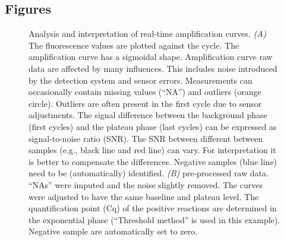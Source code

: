 \documentclass[twocolumn]{bmcart}%
\begin{document}
\begin{backmatter}




\section*{Figures}
  \begin{figure}[h]
  \caption{\label{figure:problems}
Analysis and interpretation of real-time amplification curves. \emph{(A)} The 
fluorescence values are plotted against the cycle. The amplification curve has a 
sigmoidal shape. Amplification curve raw data are affected by many influences. 
This includes noise introduced by the detection system and sensor errors. 
Measurements can occasionally contain missing values (``NA'') and outliers 
(orange circle). Outliers are often present in the first cycle due to sensor 
adjustments. The signal difference between the background phase (first cycles) 
and the plateau phase (last cycles) can be expressed as signal-to-noise ratio 
(SNR). The SNR between different between samples (e.g., black line and red line) 
can vary. For interpretation it is better to compensate the 
differences. Negative samples (blue line) need to be (automatically) identified. 
\emph{(B)} pre-processed raw data. ``NAs'' were imputed and the noise slightly 
removed. The curves were adjusted to have the same baseline and plateau level. 
The quantification point (Cq) of the positive reactions are determined in the 
exponential phase (``Threshold method'' is used in this example). Negative 
sample are automatically set to zero.
}
      \end{figure}


\end{backmatter}
\end{document}
